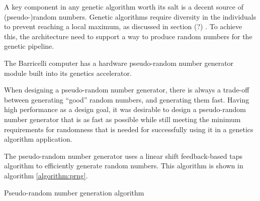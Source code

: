 A key component in any genetic algorithm worth its salt is a decent source of (pseudo-)random numbers.
Genetic algorithms require diversity in the individuals to prevent reaching a local maximum, as discussed in section (?) . 
To achieve this, the architecture need to support a way to produce random numbers for the genetic pipeline.   

The Barricelli computer has a hardware pseudo-random number generator module built into its genetics accelerator.

When designing a pseudo-random number generator, there is always a trade-off between generating ``good'' random numbers, and generating them fast.
Having high performance as a design goal\cn, it was desirable to design a pseudo-random number generator that is as fast as possible while still meeting the minimum requirements for randomness that is needed for successfully using it in a genetics algorithm application.

The pseudo-random number generator uses a linear shift feedback-based taps algorithm to efficiently generate random numbers.
This algorithm is shown in algorithm \vref{algorithm:prng}.

\begin{algorithm}[H]
\SetAlgoLined
\DontPrintSemicolon
{}
\caption{Pseudo-random number generation algorithm}
\label{algorithm:prng}
\end{algorithm}
